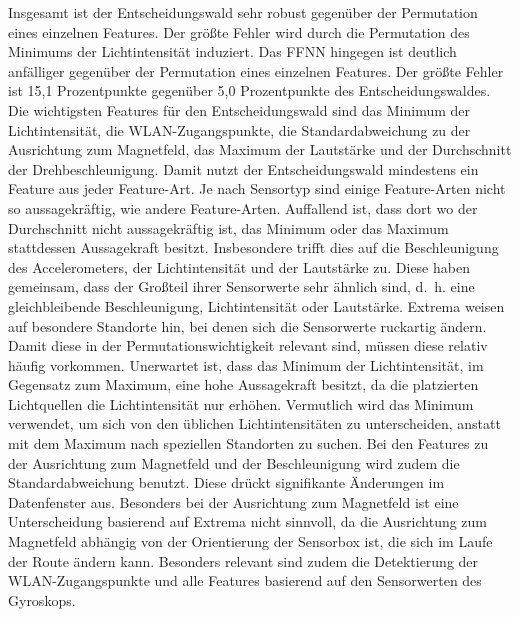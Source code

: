 \newline
Insgesamt ist der Entscheidungswald sehr robust gegenüber der Permutation eines einzelnen Features.
Der größte Fehler wird durch die Permutation des Minimums der Lichtintensität induziert.
Das FFNN hingegen ist deutlich anfälliger gegenüber der Permutation eines einzelnen Features.
Der größte Fehler ist 15,1 Prozentpunkte gegenüber 5,0 Prozentpunkte des Entscheidungswaldes.
\newline
\newline
Die wichtigsten Features für den Entscheidungswald sind das Minimum der Lichtintensität, die WLAN-Zugangspunkte, die Standardabweichung zu der Ausrichtung zum Magnetfeld,
das Maximum der Lautstärke und der Durchschnitt der Drehbeschleunigung.
Damit nutzt der Entscheidungswald mindestens ein Feature aus jeder Feature-Art.
Je nach Sensortyp sind einige Feature-Arten nicht so aussagekräftig, wie andere Feature-Arten.
\newline
\newline
Auffallend ist, dass dort wo der Durchschnitt nicht aussagekräftig ist, das Minimum oder das Maximum stattdessen Aussagekraft besitzt.
Insbesondere trifft dies auf die Beschleunigung des Accelerometers, der Lichtintensität und der Lautstärke zu.
Diese haben gemeinsam, dass der Großteil ihrer Sensorwerte sehr ähnlich sind,
d.~h. eine gleichbleibende Beschleunigung, Lichtintensität oder Lautstärke.
Extrema weisen auf besondere Standorte hin, bei denen sich die Sensorwerte ruckartig ändern.
Damit diese in der Permutationswichtigkeit relevant sind, müssen diese relativ häufig vorkommen.
\newpage
Unerwartet ist, dass das Minimum der Lichtintensität, im Gegensatz zum Maximum, eine hohe Aussagekraft besitzt, da die platzierten Lichtquellen die Lichtintensität nur erhöhen.
Vermutlich wird das Minimum verwendet, um sich von den üblichen Lichtintensitäten zu unterscheiden, anstatt mit dem Maximum nach speziellen Standorten zu suchen.
\newline
\newline
Bei den Features zu der Ausrichtung zum Magnetfeld und der Beschleunigung wird zudem die Standardabweichung benutzt.
Diese drückt signifikante Änderungen im Datenfenster aus.
Besonders bei der Ausrichtung zum Magnetfeld ist eine Unterscheidung basierend auf Extrema nicht sinnvoll,
da die Ausrichtung zum Magnetfeld abhängig von der Orientierung der Sensorbox ist, die sich im Laufe der Route ändern kann.
\newline
\newline
Besonders relevant sind zudem die Detektierung der WLAN-Zugangspunkte und alle Features basierend auf den Sensorwerten des Gyroskops.
